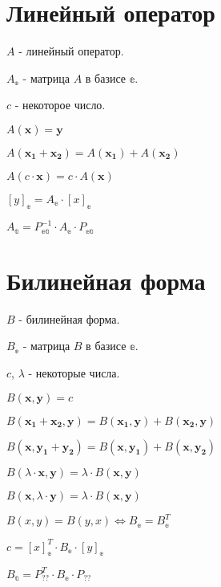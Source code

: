 \section{Линейный оператор}

$A$ - линейный оператор.

$A_\mathbb{e}$ - матрица $A$ в базисе $\mathbb{e}$.

$c$ - некоторое число.
 
$\displaystyle A(\boldsymbol{x}) = \boldsymbol{y} $

$\displaystyle A(\boldsymbol{x_1} + \boldsymbol{x_2}) = A(\boldsymbol{x_1}) + A(\boldsymbol{x_2}) $

$\displaystyle A(c\cdot\boldsymbol{x}) = c\cdot A(\boldsymbol{x}) $

$\displaystyle [y]_\mathbb{e} = A_\mathbb{e} \cdot [x]_\mathbb{e} $

$\displaystyle A_\mathbb{a} = P_\mathbb{ea}^{-1} \cdot A_\mathbb{e} \cdot P_\mathbb{ea} $

\section{Билинейная форма}

$B$ - билинейная форма.

$B_\mathbb{e}$ - матрица $B$ в базисе $\mathbb{e}$.

$c$, $\lambda$ - некоторые числа.

$\displaystyle B(\boldsymbol{x}, \boldsymbol{y}) = c$

$\displaystyle B(\boldsymbol{x_1} + \boldsymbol{x_2}, \boldsymbol{y}) = B(\boldsymbol{x_1}, \boldsymbol{y}) + B(\boldsymbol{x_2}, \boldsymbol{y}) $

$\displaystyle B(\boldsymbol{x}, \boldsymbol{y_1} + \boldsymbol{y_2}) = B(\boldsymbol{x}, \boldsymbol{y_1}) + B(\boldsymbol{x}, \boldsymbol{y_2}) $

$\displaystyle B(\lambda\cdot \boldsymbol{x}, \boldsymbol{y}) =  \lambda\cdot B(\boldsymbol{x}, \boldsymbol{y})$

$\displaystyle B(\boldsymbol{x}, \lambda\cdot \boldsymbol{y}) =  \lambda\cdot B(\boldsymbol{x}, \boldsymbol{y})$

$\displaystyle B(x, y) = B(y, x) \Leftrightarrow B_\mathbb{e} = B_\mathbb{e}^T $

$\displaystyle c = [x]_\mathbb{e}^T \cdot B_\mathbb{e} \cdot [y]_\mathbb{e} $

$\displaystyle B_\mathbb{a} = P_\mathbb{??}^T \cdot B_\mathbb{e} \cdot P_\mathbb{??} $

